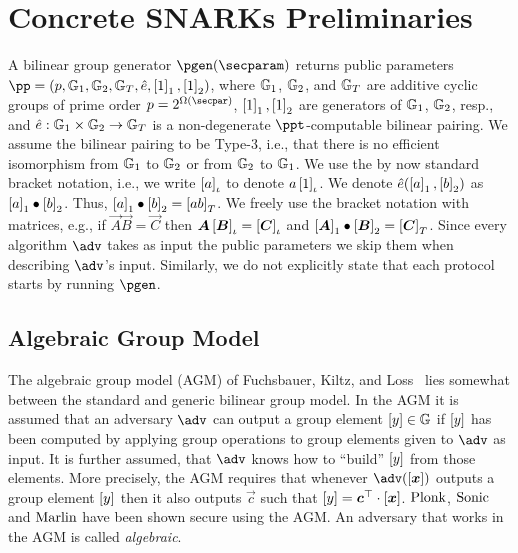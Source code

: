\section{Concrete SNARKs Preliminaries}

A bilinear group generator $\pgen (\secparam)$ returns public parameters $ \pp =
(p, \GRP_1, \GRP_2, \GRP_T, \pair, \gone{1}, \gtwo{1})$, where $\mathbb{G}_1$,
$\mathbb{G}_2$, and $\mathbb{G}_T$ are additive cyclic groups of prime order $p = 2^{\Omega
  (\secpar)}$, $\left[1\right]_{1}, \left[1\right]_{2}$ are generators of $\mathbb{G}_1$, $\mathbb{G}_2$, resp.,
and $\hat{e}: \mathbb{G}_1 \times \mathbb{G}_2 \to \mathbb{G}_T$ is a non-degenerate
$\ppt$-computable bilinear pairing. We assume the bilinear pairing to be Type-3,
i.e., that there is no efficient isomorphism from $\mathbb{G}_1$ to $\mathbb{G}_2$ or from
$\mathbb{G}_2$ to $\mathbb{G}_1$. We use the by now standard bracket notation, i.e., we
write $\left[a\right]_{\iota}$ to denote $a \left[1\right]_{\iota}$. %
We denote $\hat{e} (\left[a\right]_{1}, \left[b\right]_{2})$ as $\left[a\right]_{1} \bullet
\left[b\right]_{2}$. Thus, $\left[a\right]_{1} \bullet \left[b\right]_{2} = \left[a b\right]_{T}$. We freely use the
bracket notation with matrices, e.g., if $\vec{A} \vec{B} = \vec{C}$ then
$\vec{A} \grpgi{\vec{B}} = \grpgi{\vec{C}}$ and $\gone{\vec{A}}\bullet
\gtwo{\vec{B}} = \gtar{\vec{C}}$. Since every algorithm $\adv$ takes as input
the public parameters we skip them when describing $\adv$'s input. Similarly, we
do not explicitly state that each protocol starts by running $\pgen$.

\subsection{Algebraic Group Model}
The algebraic group model (AGM) of Fuchsbauer, Kiltz, and Loss~\cite{C:FucKilLos18} lies somewhat between the
standard and generic bilinear group model. In the AGM it is assumed that an
adversary $\adv$ can output a group element $\left[y\right] \in \mathbb{G}$ if $\left[y\right]$ has
been computed by applying group operations to group elements given to $\adv$ as
input. It is further assumed, that $\adv$ knows how to ``build'' $\left[y\right]$ from
those elements. More precisely, the AGM requires that whenever $\adv(\gnone{\vec{x}})$
outputs a group element $\left[y\right]$ then it also outputs $\vec{c}$ such that
$\gnone{y} = \vec{c}^\top \cdot \gnone{\vec{x}}$. $\textnormal{{Plonk}}$, ${\textnormal{{Sonic}}}$ and ${\textnormal{{Marlin}}}$
have been shown secure using the AGM. An adversary that works in the AGM is called
\emph{algebraic}.

